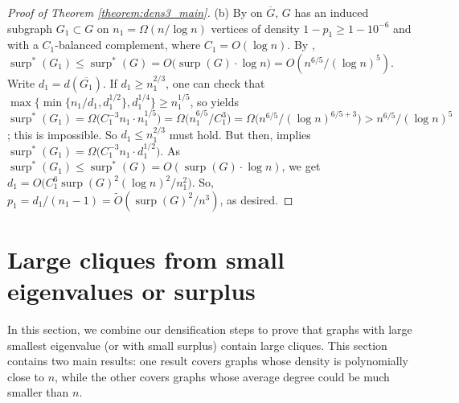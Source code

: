 \documentclass[11pt]{article}
\theoremstyle{plain}
\theoremstyle{definition}
\DeclareMathOperator{\surp}{surp}
\begin{document}
\begin{proof}[Proof of Theorem \ref{theorem:dens3_main}]
(b) 
    By  on $\overline{G}$, $G$ has an induced subgraph $G_1\subset G$ on $n_1=\Omega(n/\log n)$ vertices of density $1-p_1 \ge 1-10^{-6}$ and with a $C_1$-balanced complement, where $C_1=O(\log n)$. 
    By , $\surp^*(G_1) \le \surp^*(G) = O\big(\surp(G)\cdot \log n\big)=O(n^{6/5}/(\log n)^5)$.
    Write $d_1 = d(\overline{G_1})$.
    If $d_1 \ge n_1^{2/3}$, one can check that $\max\big\{\min\{n_1/d_1, d_1^{1/2}\}, d_1^{1/4}\big\} \ge n_1^{1/5}$, 
    so  yields $\surp^*(G_1)= \Omega\big(C_1^{-3}n_1\cdot n_1^{1/5}\big) = \Omega\big(n_1^{6/5}/C_1^3\big)=\Omega\big(n^{6/5}/(\log n)^{6/5+3}\big)>n^{6/5}/(\log n)^5$; this is impossible.
    So $d_1 \le n_1^{2/3}$ must hold.
    But then,  implies $\surp^*(G_1)= \Omega\big(C_1^{-3}n_1\cdot d_1^{1/2}\big)$.
    As $\surp^*(G_1) \le \surp^*(G)=O(\surp(G)\cdot \log n)$, we get $d_1 = O\big(C_1^6\surp(G)^2(\log n)^2/n_1^2\big)$.
    So, $p_1=d_1/(n_1-1)=\widetilde{O}(\surp(G)^2/n^3)$, as desired.
\end{proof}

\section{Large cliques from small eigenvalues or surplus}\label{sect:cliques}

In this section, we combine our densification steps to prove that graphs with large smallest eigenvalue (or with small surplus) contain large cliques. 
This section contains two main results: one result covers graphs whose density is polynomially close to $n$, while the other covers graphs whose average degree could be much smaller than $n$.
\end{document}
